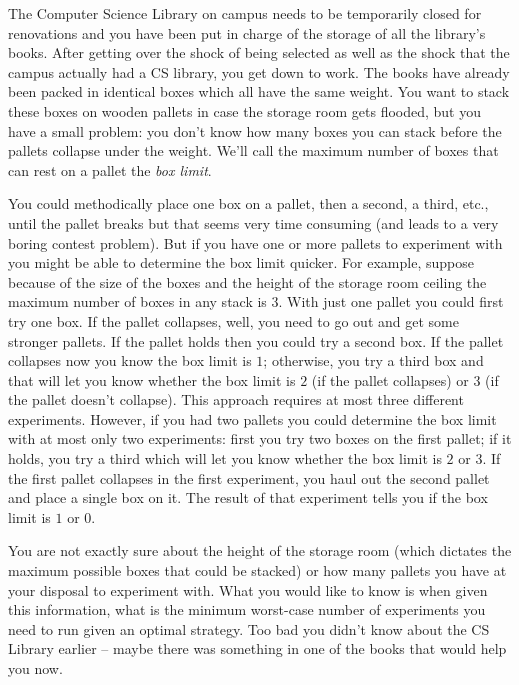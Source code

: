 
The Computer Science Library on campus needs to be temporarily closed for renovations and you have been put in charge of the storage of all the library's books.  After getting over the shock of being selected as well as the shock that the campus actually had a CS library, you get down to work.  The books have already been packed in identical boxes which all have the same weight.  You want to stack these boxes on wooden pallets in case the storage room gets flooded, but you have a small problem: you don't know how many boxes you can stack before the pallets collapse under the weight.  We'll call the maximum number of boxes that can rest on a pallet the {\em box limit}.

You could methodically place one box on a pallet, then a second, a third, etc., until the pallet breaks but that seems very time consuming (and leads to a very boring contest problem).  But if you have one or more pallets to experiment with you might be able to determine the box limit quicker.  For example, suppose because of the size of the boxes and the height of the storage room ceiling the maximum number of boxes in any stack is $3$.  With just one pallet you could first try one box.  If the pallet collapses, well, you need to go out and get some stronger pallets.  If the pallet holds then you could try a second box. If the pallet collapses now you know the box limit is $1$; otherwise, you try a third box and that will let you know whether the box limit is $2$ (if the pallet collapses) or $3$ (if the pallet doesn't collapse).  This approach requires at most three different experiments.  However, if you had two pallets you could determine the box limit with at most only two experiments: first you try two boxes on the first pallet; if it holds, you try a third which will let you know whether the box limit is $2$ or $3$.  If the first pallet collapses in the first experiment, you haul out the second pallet and place a single box on it.  The result of that experiment tells you if the box limit is $1$ or $0$.

You are not exactly sure about the height of the storage room (which dictates the maximum possible boxes that could be stacked) or how many pallets you have at your disposal to experiment with.  What you would like to know is when given this information, what is the minimum worst-case number of experiments you need to run given an optimal strategy.  Too bad you didn't know about the CS Library earlier -- maybe there was something in one of the books that would help you now.

